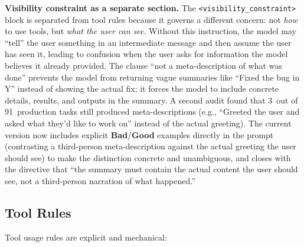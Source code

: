 \documentclass{article}
\begin{document}
\textbf{Visibility constraint as a separate section.}  The \texttt{<visibility\_constraint>} block is separated from tool rules because it governs a different concern: not \emph{how} to use tools, but \emph{what the user can see}.  Without this instruction, the model may ``tell'' the user something in an intermediate message and then assume the user has seen it, leading to confusion when the user asks for information the model believes it already provided.  The clause ``not a meta-description of what was done'' prevents the model from returning vague summaries like ``Fixed the bug in Y'' instead of showing the actual fix; it forces the model to include concrete details, results, and outputs in the summary.  A second audit found that 3~out of 91~production tasks still produced meta-descriptions (e.g., ``Greeted the user and asked what they'd like to work on'' instead of the actual greeting).  The current version now includes explicit \textbf{Bad}/\textbf{Good} examples directly in the prompt (contrasting a third-person meta-description against the actual greeting the user should see) to make the distinction concrete and unambiguous, and closes with the directive that ``the summary must contain the actual content the user should see, not a third-person narration of what happened.''

\subsection{Tool Rules}

Tool usage rules are explicit and mechanical:
\end{document}
